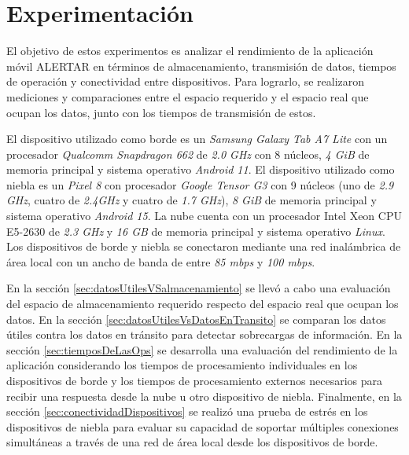 \chapter{Experimentación}\label{cap:experimentacion}

El objetivo de estos experimentos es analizar el rendimiento de la aplicación móvil ALERTAR en términos de almacenamiento, transmisión de datos, tiempos de operación y conectividad entre dispositivos. Para lograrlo, se realizaron mediciones y comparaciones entre el espacio requerido y el espacio real que ocupan los datos, junto con los tiempos de transmisión de estos.

El dispositivo utilizado como borde es un \textit{Samsung Galaxy Tab A7 Lite} con un procesador \textit{Qualcomm Snapdragon 662} de \textit{2.0 GHz} con 8 núcleos, \textit{4 GiB} de memoria principal y sistema operativo \textit{Android 11}. El dispositivo utilizado como niebla es un \textit{Pixel 8} con procesador \textit{Google Tensor G3} con 9 núcleos (uno de \textit{2.9 GHz}, cuatro de \textit{2.4GHz} y cuatro de \textit{1.7 GHz}), \textit{8 GiB} de memoria principal y sistema operativo \textit{Android 15}. La nube cuenta con un procesador Intel Xeon CPU E5-2630 de \textit{2.3 GHz} y \textit{16 GB} de memoria principal y sistema operativo \textit{Linux}. Los dispositivos de borde y niebla se conectaron mediante una red inalámbrica de área local con un ancho de banda de entre \textit{85 mbps} y \textit{100 mbps}.

En la sección \ref{sec:datosUtilesVSalmacenamiento} se llevó a cabo una evaluación del espacio de almacenamiento requerido respecto del espacio real que ocupan los datos. En la sección \ref{sec:datosUtilesVsDatosEnTransito} se comparan los datos útiles contra los datos en tránsito para detectar sobrecargas de información. En la sección \ref{sec:tiemposDeLasOps} se desarrolla una evaluación del rendimiento de la aplicación considerando los tiempos de procesamiento individuales en los dispositivos de borde y los tiempos de procesamiento externos necesarios para recibir una respuesta desde la nube u otro dispositivo de niebla. Finalmente, en la sección \ref{sec:conectividadDispositivos} se realizó una prueba de estrés en los dispositivos de niebla para evaluar su capacidad de soportar múltiples conexiones simultáneas a través de una red de área local desde los dispositivos de borde.



